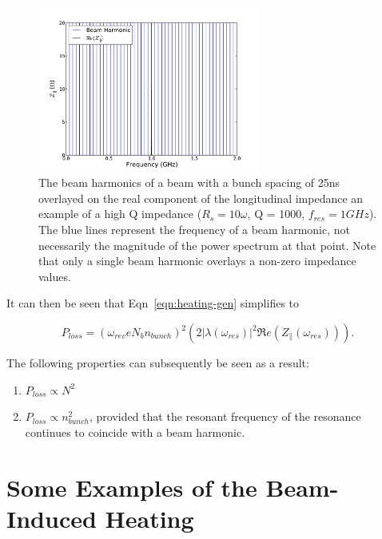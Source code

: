 \documentclass[12pt,a4paper,twopage,openright]{report}
\begin{document}
\begin{figure}
\begin{center}
\includegraphics[width=0.65\textwidth]{figures/high_q_1000_resonance_beam_harmonics.pdf}
\end{center}
\label{fig:high_q_harmonics}
\caption{The beam harmonics of a beam with a bunch spacing of 25ns overlayed on the real component of the longitudinal impedance an example of a high Q impedance ($R_{s}=10\omega$, Q = 1000, $f_{res}=1GHz$). The blue lines represent the frequency of a beam harmonic, not necessarily the magnitude of the power spectrum at that point. Note that only a single beam harmonic overlays a non-zero impedance values.}
\end{figure}

It can then be seen that Eqn~\ref{eqn:heating-gen} simplifies to

\begin{equation}
P_{loss} = \left( \omega_{rev}eN_{b}n_{bunch}  \right)^{2}  \left( 2 \left| \lambda \left( \omega_{res} \right)  \right|^{2}  \Re{}e \left( Z_{\parallel} \left(\omega_{res} \right) \right) \right). 
\label{ean:heating-high-q}
\end{equation}

The following properties can subsequently be seen as a result:

\begin{enumerate}
\item{$P_{loss} \propto N^{2}$}
\item{$P_{loss} \propto n_{bunch}^{2}$, provided that the resonant frequency of the resonance continues to coincide with a beam harmonic.}
\end{enumerate}

\section{Some Examples of the Beam-Induced Heating}
\end{document}
